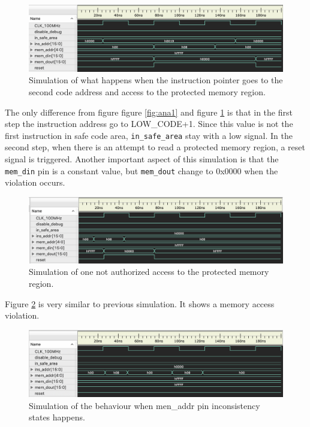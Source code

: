 \begin{figure}[h]
\centering
\includegraphics[width=1\textwidth]{figuras/ana2}
\caption{Simulation of what happens when the instruction pointer goes to the second code address and access to the protected memory region.}
\label{fig:ana2}
\end{figure}

The only difference from figure figure \ref{fig:ana1} and figure \ref{fig:ana2} is that in the first step  the instruction address go to  LOW\_CODE+1. Since this value is not the first instruction in safe code area, \verb|in_safe_area| stay with a low signal. In the second step, when there is an attempt to read a protected memory region, a reset signal is triggered. Another important aspect of this simulation is that the \verb|mem_din| pin is a constant value, but \verb|mem_dout| change to 0x0000 when the violation occurs. 

\begin{figure}[h]
	\centering
	\includegraphics[width=1\textwidth]{figuras/ana3}
	\caption{Simulation of one not authorized access to the protected memory region.}
	\label{fig:ana3}
\end{figure}

Figure \ref{fig:ana3} is very similar to previous simulation. It shows a memory access violation.

\begin{figure}[h]
	\centering
	\includegraphics[width=1\textwidth]{figuras/ana4}
	\caption{Simulation of the behaviour when men\_addr pin inconsistency states happens.}
	\label{fig:ana4}
\end{figure}

